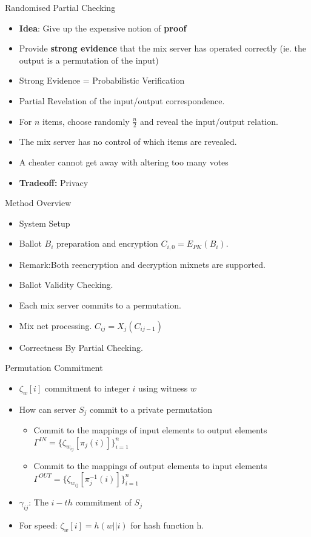 \documentclass{beamer}
\begin{document}
\begin{frame}[allowframebreaks]{Randomised Partial Checking \cite{JJR02}}

\begin{itemize}
\item \textbf{Idea}: Give up the expensive notion of \textbf{proof}
\item Provide \textbf{strong evidence} that the mix server has operated correctly (ie. the output is a permutation of the input)
\item Strong Evidence = Probabilistic Verification
\item Partial Revelation of the input/output correspondence.
\item For $n$ items, choose randomly $\frac{n}{2}$ and reveal the input/output relation.
\item The mix server has no control of which items are revealed.
\item A cheater cannot get away with altering too many votes
\item \textbf{Tradeoff:} Privacy
\end{itemize}

\begin{block}{Method Overview}
\begin{itemize}
\item System Setup
\item Ballot $B_i$ preparation and encryption $C_{i,0} = E_{PK}(B_i)$. 
\item Remark:Both reencryption and decryption mixnets are supported.
\item Ballot Validity Checking.
\item Each mix server commits to a permutation.
\item Mix net processing. $C_{ij} = X_j(C_{ij-1})$
\item Correctness By Partial Checking.
\end{itemize}
\end{block}

\framebreak

\begin{block}{Permutation Commitment}
\begin{itemize}
\item $\zeta_w[i]$ commitment to integer $i$ using witness $w$
\item How can server $S_j$ commit to a private permutation
\begin{itemize}
\item Commit to the mappings of input elements to output elements $\Gamma^{IN} = \{ \zeta_{w_{ij}}[\pi_j(i)] \}_{i=1}^n$
\item Commit to the mappings of output elements to input elements $\Gamma^{OUT} = \{ \zeta_{w_{ij}}[\pi^{-1}_j(i)] \}_{i=1}^n$
\end{itemize}
\item $\gamma_{ij}$: The $i-th$ commitment of $S_j$
\item For speed: $\zeta_w[i]=h(w||i)$ for hash function h.
\end{itemize}
\end{block}


\end{frame}
\end{document}
